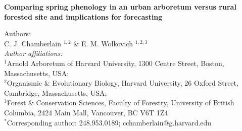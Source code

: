 \documentclass{article}\usepackage[]{graphicx}\usepackage[]{color}
\begin{document}
\noindent\textbf{\Large{Comparing spring phenology in an urban arboretum versus rural forested site and implications for forecasting}}

\noindent Authors:\\
C. J. Chamberlain $^{1,2}$ \& E. M. Wolkovich $^{1,2,3}$
\vspace{2ex}\\
\emph{Author affiliations:}\\
$^{1}$Arnold Arboretum of Harvard University, 1300 Centre Street, Boston, Massachusetts, USA; \\
$^{2}$Organismic \& Evolutionary Biology, Harvard University, 26 Oxford Street, Cambridge, Massachusetts, USA; \\
$^{3}$Forest \& Conservation Sciences, Faculty of Forestry, University of British Columbia, 2424 Main Mall, Vancouver, BC V6T 1Z4\\
\vspace{2ex}
$^*$Corresponding author: 248.953.0189; cchamberlain@g.harvard.edu\\

\renewcommand{\thetable}{\arabic{table}}
\renewcommand{\thefigure}{\arabic{figure}}
\renewcommand{\labelitemi}{$-$}

\end{document}
